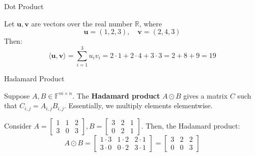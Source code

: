 \documentclass{beamer}
\begin{document}
    \begin{frame}{Dot Product}
        \begin{example}
            Let $\mathbf{u}, \mathbf{v}$ are vectors over the real number $\mathbb{R}$, where
            \begin{equation*}
                \mathbf{u} = (1, 2, 3), \quad \mathbf{v} = (2, 4, 3)
            \end{equation*}
            Then: 
            \begin{equation*}
                \langle \mathbf{u}, \mathbf{v}\rangle = \sum_{i=1}^{3}u_iv_i = 2 \cdot 1 + 2 \cdot 4 + 3 \cdot 3 = 2 + 8 + 9 = 19
            \end{equation*}
        \end{example}
    \end{frame}

    \begin{frame}{Hadamard Product}
        \begin{definition}
            Suppose $A,B \in \mathbb{F}^{m \times n}$. The \textbf{Hadamard product} $A \odot B$ 
            gives a matrix $C$ such that $C_{i,j} = A_{i,j}B_{i,j}$. Essentially, we multiply 
            elements elementwise.
        \end{definition}
        
        \begin{example}
            Consider $A = \begin{bmatrix}
                1 & 1 & 2 \\
                3 & 0 & 3
            \end{bmatrix}, B = \begin{bmatrix}
                3 & 2 & 1 \\ 0 & 2 & 1
            \end{bmatrix}$. Then, the Hadamard product:
            \begin{equation*}
                A \odot B = \begin{bmatrix}
                    1 \cdot 3 & 1 \cdot 2 & 2 \cdot 1 \\
                    3 \cdot 0 & 0 \cdot 2 & 3 \cdot 1
                \end{bmatrix} = \begin{bmatrix}
                    3 & 2 & 2 \\
                    0 & 0 & 3
                \end{bmatrix}
            \end{equation*}
        \end{example}
    \end{frame}
\end{document}
